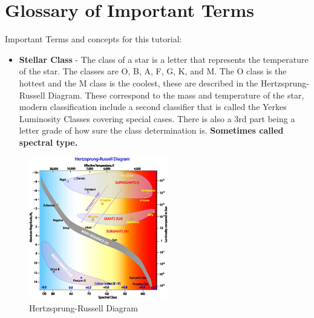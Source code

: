 \documentclass[12pt,oneside,a4paper,english]{article}
\begin{document}
\section{Glossary of Important Terms}
Important Terms and concepts for this tutorial:
\begin{itemize}
    \item \textbf{Stellar Class} - The class of a star is a letter that represents the temperature of the star. The classes are O, B, A, F, G, K, and M. The O class is the hottest and the M class is the coolest, these are described in the Hertzsprung-Russell Diagram. These correspond to the mass and temperature of the star, modern classification include a second classifier that is called the Yerkes Luminosity Classes covering special cases. There is also a 3rd part being a letter grade of how sure the class determination is. \textbf{Sometimes called spectral type.}
\end{itemize}
    \begin{figure}
        \centering
        \includegraphics[width=0.54\textwidth]{hrdiagram1.jpg}
        \caption{Hertzsprung-Russell Diagram \cite{hertz}}
        \label{fig:hertz}
    \end{figure}
\end{document}
